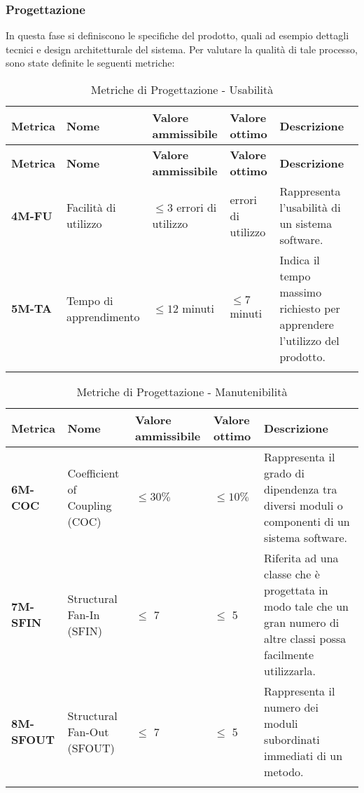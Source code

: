 \subsubsection{Progettazione}
In questa fase si definiscono le specifiche del prodotto, quali ad esempio dettagli tecnici e design architetturale del sistema.
Per valutare la qualità di tale processo, sono state definite le seguenti metriche:
\begin{longtable}{|>{\raggedright\arraybackslash}m{}|>{\raggedright\arraybackslash}m{}|>{\raggedright\arraybackslash}m{}|>{\raggedright\arraybackslash}m{}|>{\raggedright\arraybackslash}m{}|}
	\hline
	\textbf{Metrica} & \textbf{Nome} & \textbf{Valore ammissibile} & \textbf{Valore ottimo} & \textbf{Descrizione}\\
	\hline
	\endfirsthead
	\hline
	\textbf{Metrica} & \textbf{Nome} & \textbf{Valore ammissibile} & \textbf{Valore ottimo} & \textbf{Descrizione}\\
	\endhead
	\textbf{4M-FU}   & Facilità di utilizzo   & $\leq 3 $ errori di utilizzo & 0 errori di utilizzo   & Rappresenta l'usabilità di un sistema software.                           \\
	\hline
	\textbf{5M-TA}   & Tempo di apprendimento & $\leq 12 $ minuti & $\leq 7 $ minuti & Indica il tempo massimo richiesto per apprendere l'utilizzo del prodotto. \\
	\hline
	\caption{Metriche di Progettazione - Usabilità}
	\label{table:2}
\end{longtable}

\begin{longtable}{|>{\raggedright\arraybackslash}m{}|>{\raggedright\arraybackslash}m{}|>{\raggedright\arraybackslash}m{}|>{\raggedright\arraybackslash}m{}|>{\raggedright\arraybackslash}m{}|}
	\hline
	\textbf{Metrica} & \textbf{Nome} & \textbf{Valore ammissibile} & \textbf{Valore ottimo} & \textbf{Descrizione}\\
	\hline
	\endfirsthead
	\hline
	\textbf{6M-COC} & Coefficient of Coupling (COC) & $\leq 30\% $ & $\leq 10\% $ & Rappresenta il grado di dipendenza tra diversi moduli o componenti di un sistema software. \\
	\hline
	\textbf{7M-SFIN} & Structural Fan-In (SFIN) & $\leq$ 7 & $\le$ 5 & Riferita ad una classe che è progettata in modo tale che un gran numero di altre classi possa facilmente utilizzarla. \\
	\hline
	\textbf{8M-SFOUT} & Structural Fan-Out (SFOUT) & $\leq$ 7 & $\le$ 5 & Rappresenta il numero dei moduli subordinati immediati di un metodo. \\
	\hline 
	\caption{Metriche di Progettazione - Manutenibilità}
	\label{table:3}
\end{longtable}

